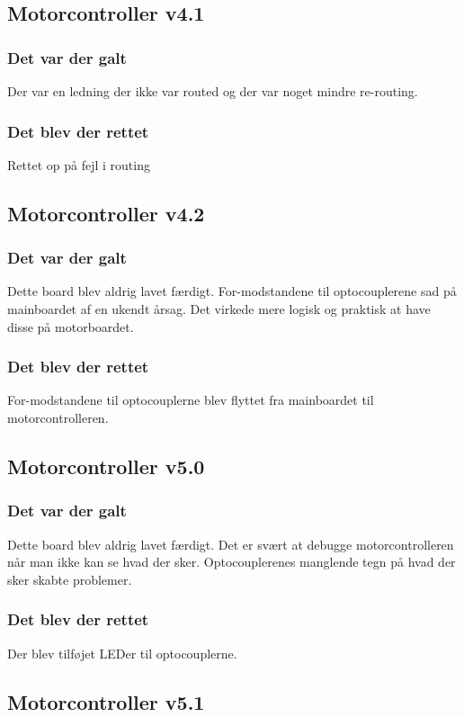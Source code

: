 \documentclass[a4paper,11pt,oneside,article,danish,table]{memoir}
\newcommand{\boarddate}[1]{\marginpar{\tiny\textcolor{blue!80!black}{#1}}}
\begin{document}
\subsection{Motorcontroller v4.1}
\boarddate{13. april 2012}
\subsubsection{Det var der galt} 
Der var en ledning der ikke var routed og der var noget mindre re-routing.
\subsubsection{Det blev der rettet}
Rettet op på fejl i routing
\subsection{Motorcontroller v4.2}
\boarddate{17. april 2012} 
\subsubsection{Det var der galt} 
Dette board blev aldrig lavet færdigt.
For-modstandene til optocouplerene sad på mainboardet af en ukendt årsag. Det virkede mere logisk og praktisk at have disse på motorboardet.
\subsubsection{Det blev der rettet}
For-modstandene til optocouplerne blev flyttet fra mainboardet til motorcontrolleren.
\subsection{Motorcontroller v5.0}
\boarddate{24. april 2012} 
\subsubsection{Det var der galt} 
Dette board blev aldrig lavet færdigt.
Det er svært at debugge motorcontrolleren når man ikke kan se hvad der sker. Optocouplerenes manglende tegn på hvad der sker skabte problemer.
\subsubsection{Det blev der rettet}
Der blev tilføjet LEDer til optocouplerne.
\subsection{Motorcontroller v5.1}
\boarddate{24. april 2012} 
\end{document}
